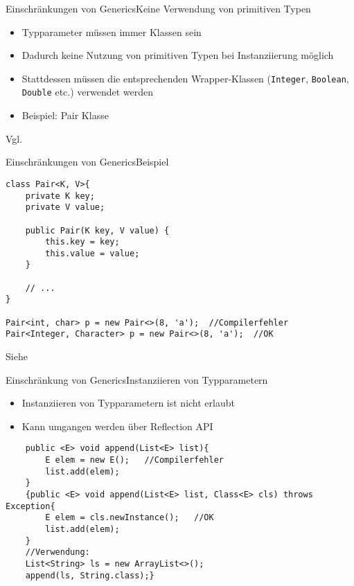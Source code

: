 \begin{frame}{Einschränkungen von Generics}{Keine Verwendung von primitiven Typen}
    \begin{itemize}
        \item Typparameter müssen immer Klassen sein
        \item Dadurch keine Nutzung von primitiven Typen bei Instanziierung möglich
        \item Stattdessen müssen die entsprechenden Wrapper-Klassen (\texttt{Integer}, \texttt{Boolean}, \texttt{Double} etc.) verwendet werden
        \item Beispiel: Pair Klasse
    \end{itemize}
Vgl. \cite{orac:restrictions}
\end{frame}

\begin{frame}[fragile]{Einschränkungen von Generics}{Beispiel}
\lstset{style=java}
\begin{lstlisting}
class Pair<K, V>{
    private K key;
    private V value;

    public Pair(K key, V value) {
        this.key = key;
        this.value = value;
    }

    // ...
}

Pair<int, char> p = new Pair<>(8, 'a');  //Compilerfehler
Pair<Integer, Character> p = new Pair<>(8, 'a');  //OK
\end{lstlisting}
Siehe \cite{orac:restrictions}
\end{frame}

\begin{frame}[fragile]{Einschränkung von Generics}{Instanziieren von Typparametern}
    \begin{itemize}
        \item Instanziieren von Typparametern ist nicht erlaubt
        \item Kann umgangen werden über Reflection API
    \end{itemize}
    \lstset{style=java}
    \begin{lstlisting}
    public <E> void append(List<E> list){
        E elem = new E();   //Compilerfehler
        list.add(elem);
    }
    {public <E> void append(List<E> list, Class<E> cls) throws Exception{
        E elem = cls.newInstance();   //OK
        list.add(elem);
    }
    //Verwendung:
    List<String> ls = new ArrayList<>();
    append(ls, String.class);}
    \end{lstlisting}
\end{frame}

